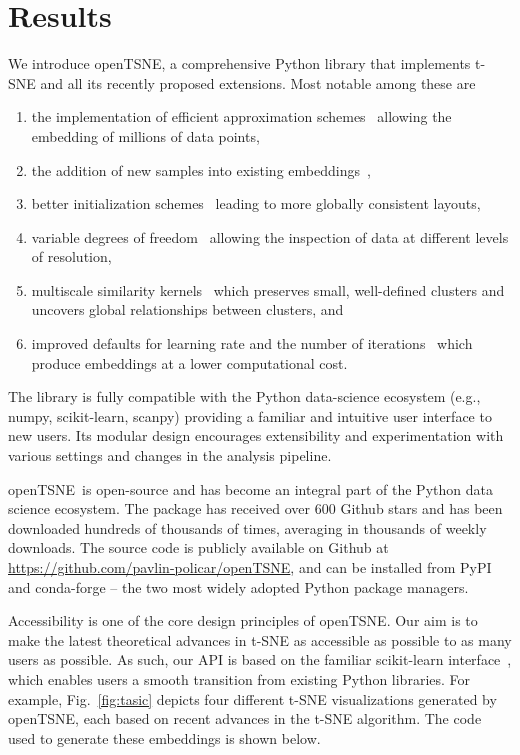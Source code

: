 \documentclass[twocolumn]{bmcart}
\newcommand{\opentsne}{\textsf{openTSNE}}
\begin{document}
\section*{Results}

We introduce \opentsne, a comprehensive Python library that implements t-SNE
and all its recently proposed extensions. Most notable among these are
\begin{enumerate} \item the implementation of efficient approximation
			schemes~\cite{van2014accelerating,linderman2019fast}
			allowing the embedding of millions of data points,
		\item the addition of new samples into existing
		embeddings~\cite{policar2019embedding}, \item better
			initialization schemes~\cite{kobak2019umap} leading to
			more globally consistent layouts, \item variable
			degrees of freedom~\cite{kobak2019heavy} allowing the
		inspection of data at different levels of resolution, \item
			multiscale similarity kernels~\cite{kobak2019art} which
			preserves small, well-defined clusters and uncovers
			global relationships between clusters, and \item
improved defaults for learning rate and the number of
iterations~\cite{belkina2019automated} which produce embeddings at a lower
computational cost.  \end{enumerate}

The library is fully compatible with the Python data-science ecosystem (e.g.,
\textsf{numpy}, \textsf{scikit-learn}, \textsf{scanpy}) providing a familiar
and intuitive user interface to new users. Its modular design encourages
extensibility and experimentation with various settings and changes in the
analysis pipeline.

\opentsne\ is open-source and has become an integral part of the Python data
science ecosystem. The package has received over 600 Github stars and has been
downloaded hundreds of thousands of times, averaging in thousands of weekly
downloads. The source code is publicly available on Github at
\url{https://github.com/pavlin-policar/openTSNE}, and can be installed from
\textsf{PyPI} and \textsf{conda-forge} -- the two most widely adopted Python
package managers.

Accessibility is one of the core design principles of \opentsne. Our aim is to
make the latest theoretical advances in t-SNE as accessible as possible to as
many users as possible. As such, our API is based on the familiar
\textsf{scikit-learn} interface~\cite{sklearn_api}, which enables users a
smooth transition from existing Python libraries. For example,
Fig.~\ref{fig:tasic} depicts four different t-SNE visualizations generated by
\opentsne, each based on recent advances in the t-SNE algorithm. The code used
to generate these embeddings is shown below.
\end{document}
